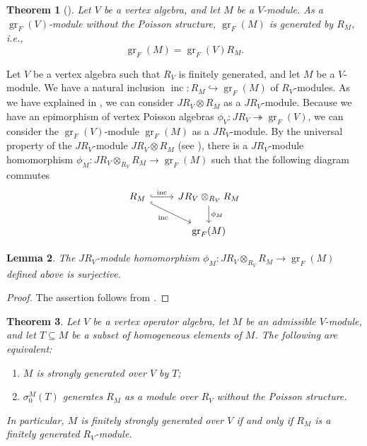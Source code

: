 \documentclass[a4paper, 12pt, reqno]{amsart}
\newtheorem{theorem}{Theorem}[section]
\newtheorem{lemma}[theorem]{Lemma}
\theoremstyle{remark}
\DeclareMathOperator{\gr}{gr}
\DeclareMathOperator{\inc}{inc}
\begin{document}
\begin{theorem}[{\cite[Lemma 4.2]{li_abelianizing_2005}}]
  \label{thr:55}
  Let $V$ be a vertex algebra, and let $M$ be a $V$-module.
  As a $\gr_F(V)$-module without the Poisson structure, $\gr_F(M)$ is generated by $R_M$, i.e.,
  \begin{equation*}
    \gr_F(M) = \gr_F(V)R_M.
  \end{equation*}
\end{theorem}

Let $V$ be a vertex algebra such that $R_V$ is finitely generated, and let $M$ be a $V$-module.
We have a natural inclusion $\inc: R_M \hookrightarrow \gr_F(M)$ of $R_V$-modules.
As we have explained in , we can consider $JR_V \otimes R_M$ as a $JR_V$-module.
Because we have an epimorphism of vertex Poisson algebras $\phi_V: JR_V \twoheadrightarrow \gr_F(V)$, we can consider the $\gr_F(V)$-module $\gr_F(M)$ as a $JR_V$-module.
By the universal property of the $JR_V$-module $JR_V \otimes R_M$ (see ), there is a $JR_V$-module homomorphism $\phi_M: JR_V \otimes_{R_V} R_M \to \gr_F(M)$ such that the following diagram commutes
\begin{equation*}
  \begin{tikzcd}
    R_M \arrow[r, "\inc", hook] \arrow[rd, "\inc"', hook] & JR_V \otimes_{R_V} R_M \arrow[d, "\phi_M"] \\
    & \gr_F(M)
  \end{tikzcd}
\end{equation*}

\begin{lemma}
  \label{lmm:27}
  The $JR_V$-module homomorphism $\phi_M: JR_V \otimes_{R_V} R_M \to \gr_F(M)$ defined above is surjective.
\end{lemma}

\begin{proof}
  The assertion follows from .
\end{proof}

\begin{theorem}
  \label{thr:56}
  Let $V$ be a vertex operator algebra, let $M$ be an admissible $V$-module, and let $T \subseteq M$ be a subset of homogeneous elements of $M$.
  The following are equivalent:
  \begin{enumerate}
  \item $M$ is strongly generated over $V$ by $T$;
  \item $\sigma^M_0(T)$ generates $R_M$ as a module over $R_V$ without the Poisson structure.
  \end{enumerate}
  In particular, $M$ is finitely strongly generated over $V$ if and only if $R_M$ is a finitely generated $R_V$-module.
\end{theorem}
\end{document}
